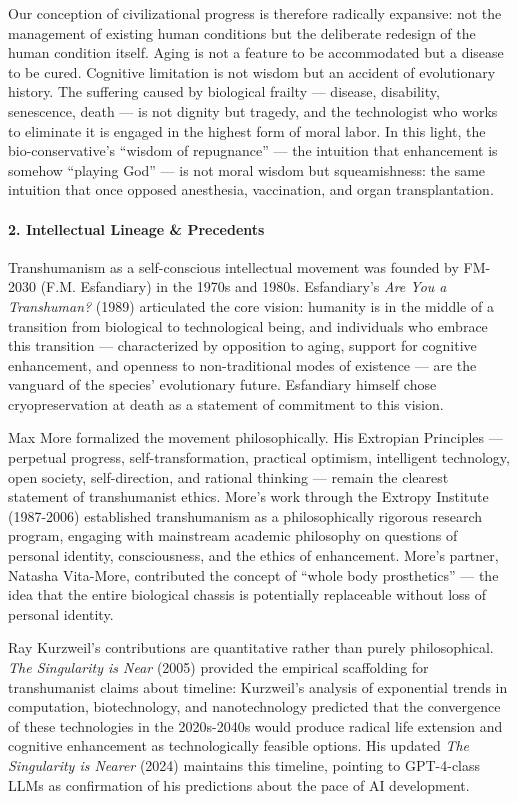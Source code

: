 Our conception of civilizational progress is therefore radically
expansive: not the management of existing human conditions but the
deliberate redesign of the human condition itself. Aging is not a
feature to be accommodated but a disease to be cured. Cognitive
limitation is not wisdom but an accident of evolutionary history. The
suffering caused by biological frailty --- disease, disability,
senescence, death --- is not dignity but tragedy, and the technologist
who works to eliminate it is engaged in the highest form of moral labor.
In this light, the bio-conservative's ``wisdom of repugnance'' --- the
intuition that enhancement is somehow ``playing God'' --- is not moral
wisdom but squeamishness: the same intuition that once opposed
anesthesia, vaccination, and organ transplantation.

\paragraph{2. Intellectual Lineage \&
Precedents}\label{intellectual-lineage-precedents-16}

Transhumanism as a self-conscious intellectual movement was founded by
FM-2030 (F.M. Esfandiary) in the 1970s and 1980s. Esfandiary's \emph{Are
You a Transhuman?} (1989) articulated the core vision: humanity is in
the middle of a transition from biological to technological being, and
individuals who embrace this transition --- characterized by opposition
to aging, support for cognitive enhancement, and openness to
non-traditional modes of existence --- are the vanguard of the species'
evolutionary future. Esfandiary himself chose cryopreservation at death
as a statement of commitment to this vision.

Max More formalized the movement philosophically. His Extropian
Principles --- perpetual progress, self-transformation, practical
optimism, intelligent technology, open society, self-direction, and
rational thinking --- remain the clearest statement of transhumanist
ethics. More's work through the Extropy Institute (1987-2006)
established transhumanism as a philosophically rigorous research
program, engaging with mainstream academic philosophy on questions of
personal identity, consciousness, and the ethics of enhancement. More's
partner, Natasha Vita-More, contributed the concept of ``whole body
prosthetics'' --- the idea that the entire biological chassis is
potentially replaceable without loss of personal identity.

Ray Kurzweil's contributions are quantitative rather than purely
philosophical. \emph{The Singularity is Near} (2005) provided the
empirical scaffolding for transhumanist claims about timeline:
Kurzweil's analysis of exponential trends in computation, biotechnology,
and nanotechnology predicted that the convergence of these technologies
in the 2020s-2040s would produce radical life extension and cognitive
enhancement as technologically feasible options. His updated \emph{The
Singularity is Nearer} (2024) maintains this timeline, pointing to
GPT-4-class LLMs as confirmation of his predictions about the pace of AI
development.

